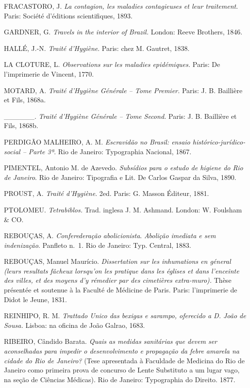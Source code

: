 FRACASTORO, J. \emph{La contagion, les maladies contagieuses et leur
traitement}. Paris: Société d'éditions scientifiques, 1893.

GARDNER, G. \emph{Travels in the interior of Brazil.} London: Reeve
Brothers, 1846.

HALLÉ, J.-N. \emph{Traité d'Hygiène}. Paris: chez M. Gautret, 1838.

LA CLOTURE, L. \emph{Observations sur les maladies epidémiques.} Paris:
De l'imprimerie de Vincent, 1770.

MOTARD, A. \emph{Traité d'Hygiène Générale -- Tome Premier.} Paris: J.
B. Baillière et Fils, 1868a.

\_\_\_\_\_\_. \emph{Traité d'Hygiène Générale -- Tome Second.} Paris: J.
B. Baillière et Fils, 1868b.

PERDIGÃO MALHEIRO, A. M. \emph{Escravidão no Brasil: ensaio
histórico-jurídico-social -- Parte 3ª}. Rio de Janeiro: Typographia
Nacional, 1867.

PIMENTEL, Antonio M. de Azevedo. \emph{Subsídios para o estudo de
higiene do Rio de Janeiro}. Rio de Janeiro: Tipografia e Lit. De Carlos
Gaspar da Silva, 1890.

PROUST, A. \emph{Traité d'Hygiène}. 2ed. Paris: G. Masson Éditeur, 1881.

PTOLOMEU. \emph{Tetrabiblos.} Trad. inglesa J. M. Ashmand. London: W.
Foulsham \& CO.

REBOUÇAS, A. \emph{Conferederação abolicionista}. \emph{Abolição
imediata e sem indenização}. Panfleto n.~1. Rio de Janeiro: Typ.
Central, 1883.

REBOUÇAS, Manuel Maurício. \emph{Dissertation sur les inhumations en
géneral (leurs resultats fâcheux lorsqu'on les pratique dans les églises
et dans l'enceinte des villes, et des moyens d'y rémedier par des
cimetières extra-muro).} Thèse présentée et soutenue à la Faculté de
Médicine de Paris. Paris: l'imprimerie de Didot le Jeune, 1831.

REINHIPO, R. M. \emph{Trattado Unico das bexigas e sarampo, oferecido a
D. João de Sousa.} Lisboa: na oficina de João Galrao, 1683.

RIBEIRO, Cândido Barata. \emph{Quais as medidas sanitárias que devem ser
aconselhadas para impedir o desenvolvimento e propagação da febre
amarela na cidade do Rio de Janeiro?} (Tese apresentada à Faculdade de
Medicina do Rio de Janeiro como primeira prova de concurso de Lente
Substituto a um lugar vago, na seção de Ciências Médicas). Rio de
Janeiro: Typographia do Direito. 1877.

